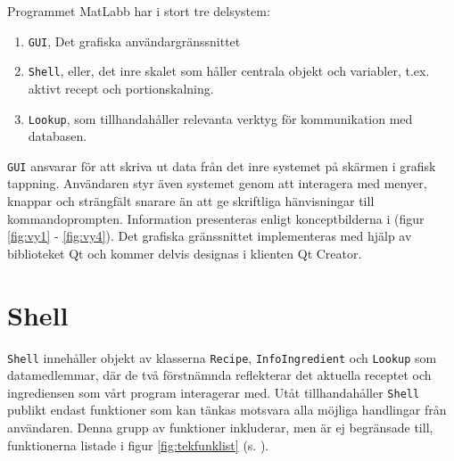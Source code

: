 Programmet MatLabb har i stort tre delsystem:

\begin{enumerate}
\item \verb+GUI+, Det grafiska användargränssnittet
\item \verb+Shell+, eller, det inre skalet som håller centrala objekt och variabler, t.ex. aktivt recept och portionskalning.
\item \verb+Lookup+, som tillhandahåller relevanta verktyg för kommunikation med databasen.
\end{enumerate}
\verb+GUI+ ansvarar för att skriva ut data från det inre systemet på skärmen i grafisk tappning. Användaren styr även systemet genom att interagera med menyer, knappar och strängfält snarare än att ge skriftliga hänvisningar till kommandoprompten. Information presenteras enligt konceptbilderna i (figur \ref{fig:vy1} - \ref{fig:vy4}). Det grafiska gränssnittet implementeras med hjälp av biblioteket Qt och kommer delvis designas i klienten Qt Creator.

\section{Shell}
\verb+Shell+ innehåller objekt av klasserna \verb+Recipe+, \verb+InfoIngredient+ och \verb+Lookup+ som datamedlemmar, där de två förstnämnda reflekterar det aktuella receptet och ingrediensen som vårt program interagerar med. Utåt tillhandahåller \verb+Shell+ publikt endast funktioner som kan tänkas motsvara alla möjliga handlingar från användaren. Denna grupp av funktioner inkluderar, men är ej begränsade till, funktionerna listade i figur \ref{fig:tekfunklist} (s. \pageref{fig:tekfunklist}).

